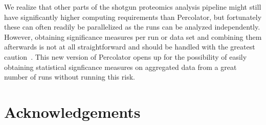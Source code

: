 \documentclass{article}
\begin{document}
We realize that other parts of the shotgun proteomics analysis
pipeline might still have significantly higher computing requirements
than Percolator, but fortunately these can often readily be
parallelized as the runs can be analyzed independently. However,
obtaining significance measures per run or data set and combining them
afterwards is not at all straightforward and should be handled with
the greatest caution~\cite{serang2015solution}. This new version of
Percolator opens up for the possibility of easily obtaining
statistical signficance measures on aggregated data from a great
number of runs without running this risk.

\section*{Acknowledgements}


{} 

\end{document}
